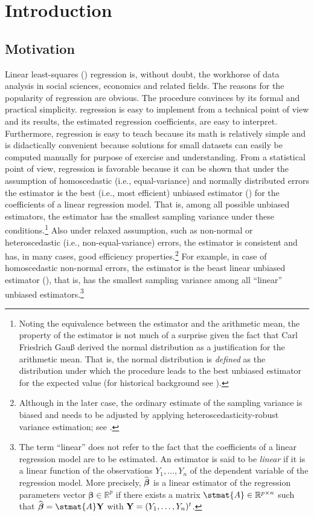 \chapter{Introduction}
\label{chap:intro}

\section{Motivation}

Linear least-squares () regression is, without doubt, the workhorse of
data analysis in social sciences, economics and related fields. The reasons for
the popularity of  regression are obvious. The procedure convinces by
its formal and practical simplicity.  regression is easy to implement
from a technical point of view and its results, the estimated regression
coefficients, are easy to interpret. Furthermore,  regression is easy
to teach because its math is relatively simple and is didactically convenient
because  solutions for small datasets can easily be computed manually
for purpose of exercise and understanding. From a statistical point of view,
 regression is favorable because it can be shown that under the
assumption of homoscedastic (i.e., equal-variance) and normally distributed
errors the  estimator is the best (i.e., most efficient) unbiased
estimator () for the coefficients of a linear regression model. That
is, among all possible unbiased estimators, the  estimator has the
smallest sampling variance under these conditions.\footnote{Noting the
equivalence between the  estimator and the arithmetic mean, the
 property of the  estimator is not much of a surprise given
the fact that Carl Friedrich Gauß derived the normal distribution as a
justification for the arithmetic mean. That is, the normal distribution is
\emph{defined} as the distribution under which the  procedure leads to
the best unbiased estimator for the expected value (for historical background
see \citealp{huber72}).} Also under relaxed assumption, such as non-normal or
heteroscedastic (i.e., non-equal-variance) errors, the  estimator is
consistent and has, in many cases, good efficiency
properties.\footnote{Although in the later case, the ordinary  estimate
of the sampling variance is biased and needs to be adjusted by applying
heteroscedasticity-robust variance estimation; see \citealp{white80}.} For
example, in case of homoscedastic non-normal errors, the  estimator is
the beast linear unbiased estimator (), that is, has the smallest
sampling variance among all “linear” unbiased estimators.\footnote{The term
“linear” does not refer to the fact that the coefficients of a linear
regression model are to be estimated. An estimator is said to be \emph{linear}
if it is a linear function of the observations $Y_1,\ldots,Y_n$ of the
dependent variable of the regression model. More precisely,
$\widehat{\boldsymbol\beta}$ is a linear estimator of the regression parameters
vector $\boldsymbol\beta \in {\mathbb R}^p$ if there exists a matrix $\stmat{A}
\in {\mathbb R}^{p \times n}$ such that
$\sthat{\boldsymbol\beta}=\stmat{A}\stvec{Y}$ with
$\mathbf Y=(Y_1,\ldots,Y_n)^t$.}

